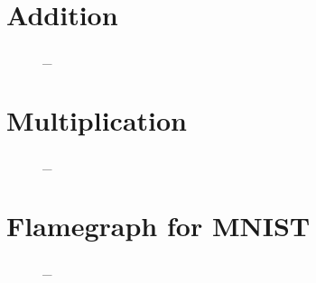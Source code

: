 \documentclass{article}
\makeatletter
\newcommand{\escapeus}{\begingroup\@makeother\_\@escapeus}
\newcommand*{\@escapeus}[1]{#1\endgroup}
\makeatother
\begin{document}
\newpage

\section{Addition}
\begin{figure}[H]
    \centering
    \escapeus{}
\end{figure} 
\newpage

\section{Multiplication}
\begin{figure}[H]
    \centering
    \escapeus{}
\end{figure}
\newpage

\section{Flamegraph for MNIST}
\begin{figure}[H]
    \centering
    \escapeus{}
\end{figure}
\newpage 
\end{document}
